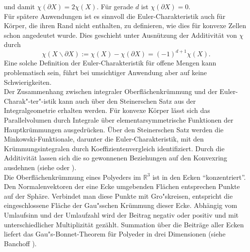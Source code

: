 und damit $\chi(\partial X)=2\chi(X)$. F\"ur gerade $d$ ist $\chi(\partial X)=0$. 
\\F\"ur sp\"atere Anwendungen ist es sinnvoll die Euler-Charakteristik auch f\"ur K\"orper, die ihren Rand nicht enthalten, zu definieren, wie dies f\"ur konvexe Zellen schon angedeutet wurde. Dies geschieht unter Ausn\"utzung der Additivit\"at von $\chi$ durch 
\begin{equation}
\label{eq:opensets}
\chi(X \backslash \partial X):=\chi(X)-\chi(\partial X)=(-1)^{d+1}\chi(X).
\end{equation}
Eine solche Definition der Euler-Charakteristik f\"ur offene Mengen kann problematisch sein, f\"uhrt bei umsichtiger Anwendung aber auf keine Schwierigkeiten.\\ 

Der Zusammenhang zwischen integraler Oberfl\"achenkr\"ummung und der Euler-Charak"-ter"-istik kann auch \"uber den Steinerschen Satz aus der Integralgeometrie erhalten werden. F\"ur konvexe K\"orper l\"asst sich das Parallelvolumen durch Integrale \"uber elementarsymmetrische Funktionen der Hauptkr\"ummungen ausgedr\"ucken. \"Uber den Steinerschen Satz werden die Minkowski-Funktionale, darunter die Euler-Charakteristik, mit den Kr\"ummungsintegralen durch Koeffizientenvergleich identifiziert. Durch die Additivit\"at lassen sich die so gewonnenen Beziehungen auf den Konvexring ausdehnen (siehe \cite{Santalo:76} oder \cite{Mecke:94}).\\
Die Oberfl\"achenkr\"ummung eines Polyeders im $\mathbb{R}^3$ ist in den Ecken ``konzentriert''. Den Normalenvektoren der eine Ecke umgebenden Fl\"achen entsprechen Punkte auf der Sph\"are. Verbindet man diese Punkte mit Gro"skreisen, entspricht die eingeschlossene Fl\"ache der Gau"sschen Kr\"ummung dieser Ecke. Abh\"angig vom Umlaufsinn und der Umlaufzahl wird der Beitrag negativ oder positiv und mit unterschiedlicher Multiplizit\"at gez\"ahlt. Summation \"uber die Beitr\"age aller Ecken liefert das Gau"s-Bonnet-Theorem f\"ur Polyeder in drei Dimensionen (siehe Banchoff \cite{Banchoff:70}).   

